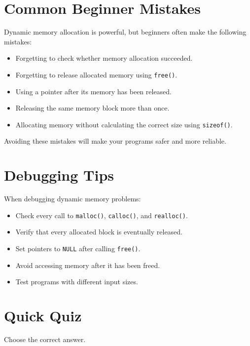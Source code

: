 \documentclass[12pt,openany]{book}
\begin{document}
\section{Common Beginner Mistakes}

Dynamic memory allocation is powerful, but beginners often make the following mistakes:

\begin{itemize}
    \item Forgetting to check whether memory allocation succeeded.
    \item Forgetting to release allocated memory using \texttt{free()}.
    \item Using a pointer after its memory has been released.
    \item Releasing the same memory block more than once.
    \item Allocating memory without calculating the correct size using \texttt{sizeof()}.
\end{itemize}

Avoiding these mistakes will make your programs safer and more reliable.

\section{Debugging Tips}

When debugging dynamic memory problems:

\begin{itemize}
    \item Check every call to \texttt{malloc()}, \texttt{calloc()}, and \texttt{realloc()}.
    \item Verify that every allocated block is eventually released.
    \item Set pointers to \texttt{NULL} after calling \texttt{free()}.
    \item Avoid accessing memory after it has been freed.
    \item Test programs with different input sizes.
\end{itemize}

\section{Quick Quiz}

Choose the correct answer.
\end{document}
